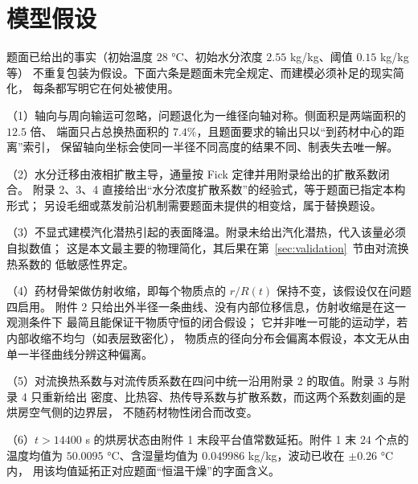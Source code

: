 \section{模型假设}

题面已给出的事实（初始温度 $28$ °C、初始水分浓度 $2.55$ kg/kg、阈值 $0.15$ kg/kg 等）
不重复包装为假设。下面六条是题面未完全规定、而建模必须补足的现实简化，
每条都写明它在何处被使用。

（1）轴向与周向输运可忽略，问题退化为一维径向轴对称。侧面积是两端面积的 $12.5$ 倍、
端面只占总换热面积的 $7.4\%$，且题面要求的输出只以“到药材中心的距离”索引，
保留轴向坐标会使同一半径不同高度的结果不同、制表失去唯一解。

（2）水分迁移由液相扩散主导，通量按 Fick 定律并用附录给出的扩散系数闭合。
附录 2、3、4 直接给出“水分浓度扩散系数”的经验式，等于题面已指定本构形式；
另设毛细或蒸发前沿机制需要题面未提供的相变焓，属于替换题设。

（3）不显式建模汽化潜热引起的表面降温。附录未给出汽化潜热，代入该量必须自拟数值；
这是本文最主要的物理简化，其后果在第~\ref{sec:validation}~节由对流换热系数的
低敏感性界定。

（4）药材骨架做仿射收缩，即每个物质点的 $r/R(t)$ 保持不变，该假设仅在问题四启用。
附件 2 只给出外半径一条曲线、没有内部位移信息，仿射收缩是在这一观测条件下
最简且能保证干物质守恒的闭合假设；
它并非唯一可能的运动学，若内部收缩不均匀（如表层致密化），
物质点的径向分布会偏离本假设，本文无从由单一半径曲线分辨这种偏离。

（5）对流换热系数与对流传质系数在四问中统一沿用附录 2 的取值。附录 3 与附录 4 只重新给出
密度、比热容、热传导系数与扩散系数，而这两个系数刻画的是烘房空气侧的边界层，
不随药材物性闭合而改变。

（6）$t>14400$ s 的烘房状态由附件 1 末段平台值常数延拓。附件 1 末 $24$ 个点的温度均值为
$50.0095$ °C、含湿量均值为 $0.049986$ kg/kg，波动已收在 $\pm0.26$ °C 内，
用该均值延拓正对应题面“恒温干燥”的字面含义。
